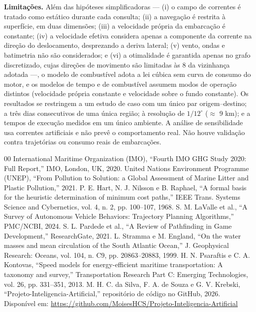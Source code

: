 \documentclass[conference]{IEEEtran}
\begin{document}
\textbf{Limitações.} Além das hipóteses simplificadoras --- (i) o campo de correntes é tratado como estático durante cada consulta; (ii) a navegação é restrita à superfície, em duas dimensões; (iii) a velocidade própria da embarcação é constante; (iv) a velocidade efetiva considera apenas a componente da corrente na direção do deslocamento, desprezando a deriva lateral; (v) vento, ondas e batimetria não são considerados; e (vi) a otimalidade é garantida apenas no grafo discretizado, cujas direções de movimento são limitadas às 8 da vizinhança adotada ---, o modelo de combustível adota a lei cúbica sem curva de consumo do motor, e os modelos de tempo e de combustível assumem modos de operação distintos (velocidade própria constante e velocidade sobre o fundo constante). Os resultados se restringem a um estudo de caso com um único par origem--destino; a três dias consecutivos de uma única região; à resolução de $1/12^\circ$ ($\approx$ 9 km); e a tempos de execução medidos em um único ambiente. A análise de sensibilidade usa correntes artificiais e não prevê o comportamento real. Não houve validação contra trajetórias ou consumo reais de embarcações.


\begin{thebibliography}{00}
 International Maritime Organization (IMO), ``Fourth IMO GHG Study 2020: Full Report,'' IMO, London, UK, 2020.
 United Nations Environment Programme (UNEP), ``From Pollution to Solution: a Global Assessment of Marine Litter and Plastic Pollution,'' 2021.
 P. E. Hart, N. J. Nilsson e B. Raphael, ``A formal basis for the heuristic determination of minimum cost paths,'' IEEE Trans. Systems Science and Cybernetics, vol. 4, n. 2, pp. 100--107, 1968.
 S. M. LaValle et al., ``A Survey of Autonomous Vehicle Behaviors: Trajectory Planning Algorithms,'' PMC/NCBI, 2024.
 S. L. Pardede et al., ``A Review of Pathfinding in Game Development,'' ResearchGate, 2021.
 L. Stramma e M. England, ``On the water masses and mean circulation of the South Atlantic Ocean,'' J. Geophysical Research: Oceans, vol. 104, n. C9, pp. 20863--20883, 1999.
 H. N. Psaraftis e C. A. Kontovas, ``Speed models for energy-efficient maritime transportation: A taxonomy and survey,'' Transportation Research Part C: Emerging Technologies, vol. 26, pp. 331--351, 2013.
 M. H. C. da Silva, F. A. de Souza e G. V. Krebski, ``Projeto-Inteligencia-Artificial,'' reposit\'orio de c\'odigo no GitHub, 2026. Dispon\'ivel em: \url{https://github.com/MoisesHCS/Projeto-Inteligencia-Artificial}
\end{thebibliography}
\end{document}

